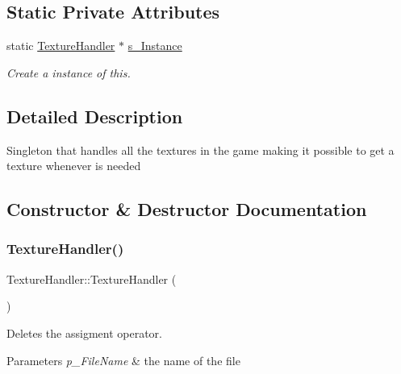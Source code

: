 \subsection*{Static Private Attributes}
\begin{DoxyCompactItemize}
\item 
\mbox{\label{class_texture_handler_af6548c4fd46c81523e63854ec4a54d01}} 
static \mbox{\hyperlink{class_texture_handler}{Texture\+Handler}} $\ast$ \mbox{\hyperlink{class_texture_handler_af6548c4fd46c81523e63854ec4a54d01}{s\+\_\+\+Instance}}
\begin{DoxyCompactList}\small\item\em Create a instance of this. \end{DoxyCompactList}\end{DoxyCompactItemize}


\subsection{Detailed Description}
Singleton that handles all the textures in the game making it possible to get a texture whenever is needed 

\subsection{Constructor \& Destructor Documentation}
\mbox{\label{class_texture_handler_a1e980f198f0f1ec4bea0f670d8f72e88}} 
\subsubsection{\texorpdfstring{Texture\+Handler()}{TextureHandler()}}
{\footnotesize\ttfamily Texture\+Handler\+::\+Texture\+Handler (\begin{DoxyParamCaption}\item[{\mbox{\hyperlink{class_texture_handler}{Texture\+Handler}} const \&}]{ }\end{DoxyParamCaption})\hspace{0.3cm}{\ttfamily [delete]}}



Deletes the assigment operator. 


\begin{DoxyParams}{Parameters}
{\em p\+\_\+\+File\+Name} & the name of the file \\
\hline
\end{DoxyParams}


